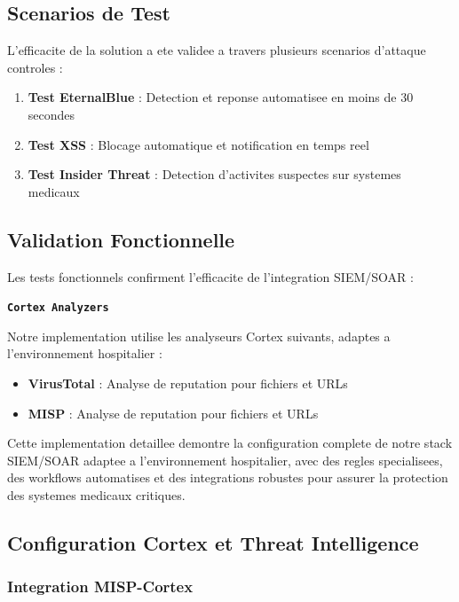 \subsection{Scenarios de Test}

L'efficacite de la solution a ete validee a travers plusieurs scenarios d'attaque controles :

\begin{enumerate}
  \item \textbf{Test EternalBlue} : Detection et reponse automatisee en moins de 30 secondes
  \item \textbf{Test XSS} : Blocage automatique et notification en temps reel
  \item \textbf{Test Insider Threat} : Detection d'activites suspectes sur systemes medicaux
\end{enumerate}

\subsection{Validation Fonctionnelle}

Les tests fonctionnels confirment l'efficacite de l'integration SIEM/SOAR :

\texttt{\textbf{Cortex Analyzers}}

Notre implementation utilise les analyseurs Cortex suivants, adaptes a l'environnement hospitalier :

\begin{itemize}
  \item \textbf{VirusTotal} : Analyse de reputation pour fichiers et URLs
  \item \textbf{MISP} : Analyse de reputation pour fichiers et URLs
\end{itemize}

Cette implementation detaillee demontre la configuration complete de notre stack SIEM/SOAR adaptee a l'environnement hospitalier, avec des regles specialisees, des workflows automatises et des integrations robustes pour assurer la protection des systemes medicaux critiques.

\subsection{Configuration Cortex et Threat Intelligence}

\subsubsection{Integration MISP-Cortex}

